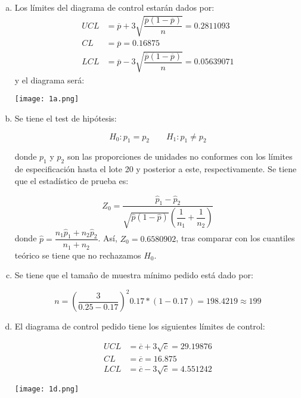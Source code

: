 \begin{solution}
\begin{enumerate}[a)]
\item Los límites del diagrama de control estarán dados por:
\begin{align*}
UCL&=\overline{p}+3\sqrt{\dfrac{\overline{p}(1-\overline{p})}{n}}=0.2811093\\
CL&=\overline{p}=0.16875\\
LCL&=\overline{p}-3\sqrt{\dfrac{\overline{p}(1-\overline{p})}{n}}=0.05639071
\end{align*}
y el diagrama será:\\
\begin{center}
\texttt{[image: 1a.png]} 
\end{center}
\item Se tiene el test de hipótesis:

$$H_0: p_1 = p_2 \quad \quad H_1: p_1 \neq p_2$$

donde $p_1$ y $p_2$ son las proporciones de unidades no conformes con los límites de especificación hasta el lote 20 y posterior a este, respectivamente. Se tiene que el estadístico de prueba es:

$$Z_0=\dfrac{\hat{p}_1-\hat{p}_2}{\sqrt{\hat{p}(1-\hat{p})}\left(\dfrac{1}{n_1}+\dfrac{1}{n_2}\right)}$$
donde $\hat{p}=\dfrac{n_1 \hat{p}_1+n_2 \hat{p}_2}{n_1+n_2}$. Así, $Z_0=0.6580902$, tras comparar con los cuantiles teórico se tiene que no rechazamos $H_0$.
\item Se tiene que el tamaño de muestra mínimo pedido está dado por:

$$n=\left(\dfrac{3}{0.25-0.17}\right)^2 0.17*(1-0.17)=198.4219 \approx 199$$

\item El diagrama de control pedido tiene los siguientes límites de control:

\begin{align*}
UCL&=\overline{c}+3\sqrt{\overline{c}}=29.19876\\
CL&=\overline{c}=16.875\\
LCL&=\overline{c}-3\sqrt{\overline{c}}=4.551242
\end{align*}

\begin{center}
\texttt{[image: 1d.png]} 
\end{center}
\end{enumerate}
\end{solution}